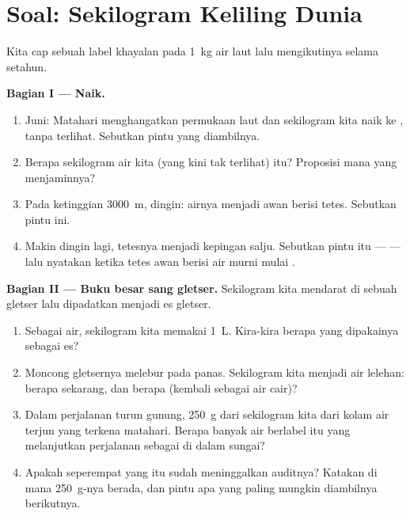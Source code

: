 \section{Soal: Sekilogram Keliling Dunia}

\begin{problem}\label{pb:g6:water-states:1}
Kita cap sebuah label khayalan pada \qty{1}{kg} air laut lalu
mengikutinya selama setahun.

\medskip\noindent\textbf{Bagian I --- Naik.}
\begin{enumerate}
  \item {} Juni: Matahari menghangatkan permukaan laut dan
        sekilogram kita naik ke , tanpa terlihat. Sebutkan pintu
        yang diambilnya.
  \item Berapa  sekilogram air kita (yang kini tak terlihat)
        itu? Proposisi mana yang menjaminnya?
  \item Pada ketinggian \qty{3000}{m},  dingin: airnya
        menjadi awan berisi tetes. Sebutkan pintu ini.
  \item Makin dingin lagi, tetesnya menjadi kepingan salju. Sebutkan
        pintu itu ---  --- lalu nyatakan  ketika tetes
        awan berisi air murni mulai .
\end{enumerate}

\medskip\noindent\textbf{Bagian II --- Buku besar sang gletser.}
Sekilogram kita mendarat di sebuah gletser lalu dipadatkan menjadi es
gletser.
\begin{enumerate}[resume]
  \item Sebagai air, sekilogram kita memakai \qty{1}{L}. Kira-kira
        berapa  yang dipakainya sebagai es?
  \item Moncong gletsernya melebur pada  panas. Sekilogram kita
        menjadi air lelehan: berapa  sekarang, dan berapa
         (kembali sebagai air cair)?
  \item Dalam perjalanan turun gunung, \qty{250}{g} dari sekilogram
        kita  dari kolam air terjun yang terkena matahari.
        Berapa banyak air berlabel itu yang melanjutkan perjalanan
        sebagai  di dalam sungai?
  \item Apakah seperempat yang  itu sudah meninggalkan
        auditnya? Katakan di mana \qty{250}{g}-nya berada, dan pintu
        apa yang paling mungkin diambilnya berikutnya.
\end{enumerate}


\end{problem}
